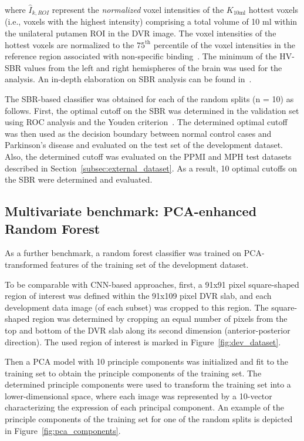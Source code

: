 where $\hat{I}_{k, ROI}$ represent the \textit{normalized} voxel intensities of the $K_{\text{10ml}}$
hottest voxels (i.e., voxels with the highest intensity) comprising a total volume of 10 ml 
within the unilateral putamen ROI in the DVR image.
The voxel intensities of the hottest voxels are normalized to the $75^{\text{th}}$ percentile of the voxel intensities 
in the reference region associated with non-specific binding~\citep{Wenzel2019}.
The minimum of the HV-SBR values from the left and right hemispheres of the brain was used for the analysis.
An in-depth elaboration on SBR analysis can be found in~\cite{Wenzel2019}.

The SBR-based classifier was obtained for each of the random splits (n = 10) as follows.
First, the optimal cutoff on the SBR was determined in the validation set
using ROC analysis and the Youden criterion~\citep{Youden1950}.
The determined optimal cutoff was then used as the decision boundary between normal control cases and Parkinson's disease 
and evaluated on the test set of the development dataset.
Also, the determined cutoff was evaluated on the PPMI and MPH test datasets described in Section~\ref{subsec:external_dataset}.
As a result, 10 optimal cutoffs on the SBR were determined and evaluated.

\subsection{Multivariate benchmark: PCA-enhanced Random Forest}
\label{subsec:pca_rfc}

As a further benchmark, a random forest classifier was trained on PCA-transformed features of the training set 
of the development dataset.

To be comparable with CNN-based approaches, first, a 91x91 pixel square-shaped region of interest 
was defined within the 91x109 pixel DVR slab, and each development data image (of each subset) was cropped to this region.
The square-shaped region was determined by cropping an equal number of pixels from the top and bottom 
of the DVR slab along its second dimension (anterior-posterior direction).
The used region of interest is marked in Figure~\ref{fig:dev_dataset}.

Then a PCA model with 10 principle components was initialized and fit to the training set to obtain 
the principle components of the training set.
The determined principle components were used to transform the training set into a lower-dimensional space,
where each image was represented by a 10-vector characterizing the expression of each principal component.
An example of the principle components of the training set for one of the random splits is depicted in Figure~\ref{fig:pca_components}.

